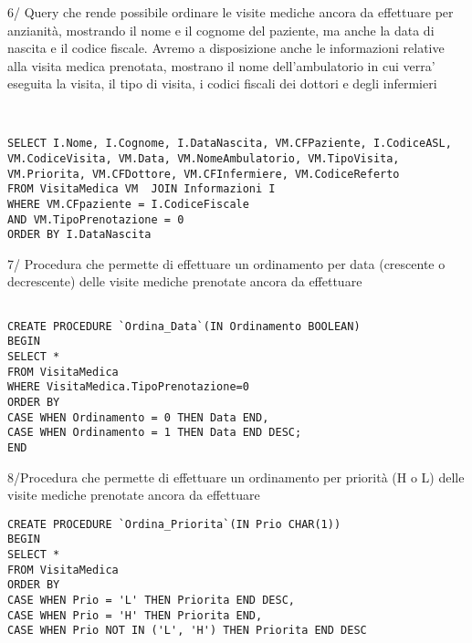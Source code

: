 \documentclass{report}
\begin{document}
6/ Query che rende possibile ordinare le visite mediche ancora da effettuare per anzianità, mostrando il nome e il cognome del paziente, ma anche la data di nascita e il codice fiscale. Avremo a disposizione anche le informazioni relative alla visita medica prenotata, mostrano il nome dell’ambulatorio in cui verra’ eseguita la visita, il tipo di visita, i codici fiscali dei dottori e degli infermieri 
\begin{verbatim}


SELECT I.Nome, I.Cognome, I.DataNascita, VM.CFPaziente, I.CodiceASL,
VM.CodiceVisita, VM.Data, VM.NomeAmbulatorio, VM.TipoVisita,
VM.Priorita, VM.CFDottore, VM.CFInfermiere, VM.CodiceReferto 
FROM VisitaMedica VM  JOIN Informazioni I 
WHERE VM.CFpaziente = I.CodiceFiscale 
AND VM.TipoPrenotazione = 0 
ORDER BY I.DataNascita
\end{verbatim}


7/ Procedura che permette di effettuare un ordinamento per data (crescente o decrescente) delle visite mediche prenotate ancora da effettuare 
\begin{verbatim}

CREATE PROCEDURE `Ordina_Data`(IN Ordinamento BOOLEAN)
BEGIN
SELECT *
FROM VisitaMedica
WHERE VisitaMedica.TipoPrenotazione=0
ORDER BY
CASE WHEN Ordinamento = 0 THEN Data END,
CASE WHEN Ordinamento = 1 THEN Data END DESC;
END
\end{verbatim}

8/Procedura che permette di effettuare un ordinamento per priorità (H o L) delle visite mediche prenotate ancora da effettuare
\begin{verbatim}
CREATE PROCEDURE `Ordina_Priorita`(IN Prio CHAR(1))
BEGIN
SELECT *
FROM VisitaMedica
ORDER BY
CASE WHEN Prio = 'L' THEN Priorita END DESC,
CASE WHEN Prio = 'H' THEN Priorita END,
CASE WHEN Prio NOT IN ('L', 'H') THEN Priorita END DESC
\end{verbatim}
\end{document}

